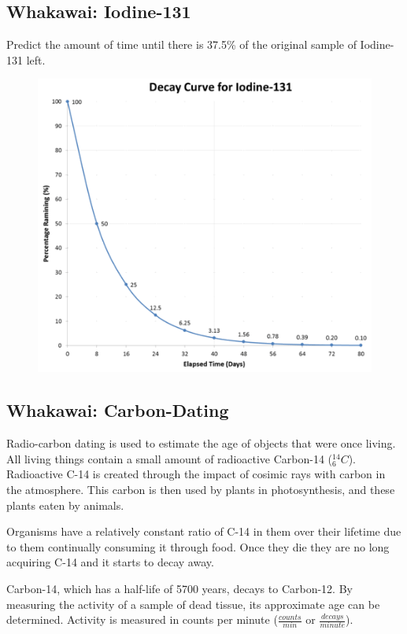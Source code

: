 \documentclass[12pt]{report}
\begin{document}
{\subsection{Whakawai: Iodine-131}
Predict the amount of time until there is 37.5\% of the original sample of Iodine-131 left.

\begin{figure}[h]
	\centering
	\includegraphics[width=0.75\linewidth]{iodine-131.png}
\end{figure}

\newpage
\subsection{Whakawai: Carbon-Dating}
Radio-carbon dating is used to estimate the age of objects that were once living. All living things contain a small amount of radioactive Carbon-14 (${}^{14}_{6}C$). Radioactive C-14 is created through the impact of cosimic rays with carbon in the atmosphere. This carbon is then used by plants in photosynthesis, and these plants eaten by animals.

Organisms have a relatively constant ratio of C-14 in them over their lifetime due to them continually consuming it through food. Once they die they are no long acquiring C-14 and it starts to decay away.

Carbon-14, which has a half-life of 5700 years, decays to Carbon-12. By measuring the activity of a sample of dead tissue, its approximate age can be determined. Activity is measured in counts per minute ($\frac{counts}{min}$ or $\frac{decays}{minute}$).

}
\end{document}
